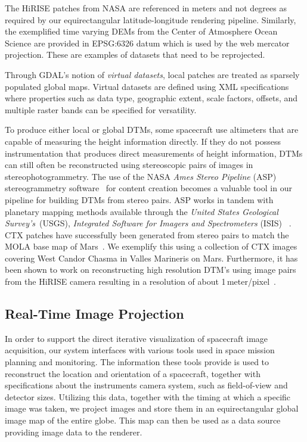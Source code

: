 \documentclass[journal]{vgtc}                %
\begin{document}
The HiRISE patches from NASA are referenced in meters and not degrees as required by our equirectangular latitude-longitude rendering pipeline.
Similarly, the exemplified time varying DEMs from the Center of Atmosphere Ocean Science are provided in EPSG:6326 datum which is used by the web mercator projection.
These are examples of datasets that need to be reprojected.

Through GDAL's notion of \emph{virtual datasets}, local patches are treated as sparsely populated global maps. Virtual datasets are defined using XML specifications where properties such as data type, geographic extent, scale factors, offsets, and multiple raster bands can be specified for versatility.

To produce either local or global DTMs, some spacecraft use altimeters that are capable of measuring the height information directly.
If they do not possess instrumentation that produces direct measurements of height information, DTMs can still often be reconstructed using stereoscopic pairs of images in stereophotogrammetry.
The use of the NASA \emph{Ames Stereo Pipeline} (ASP) stereogrammetry software~\cite{moratto2010ames} for content creation becomes a valuable tool in our pipeline for building DTMs from stereo pairs.
ASP works in tandem with planetary mapping methods available through the \emph{United States Geological Survey's}~(USGS), \emph{Integrated Software for Imagers and Spectrometers} (ISIS) ~\cite{gaddis1997overview}.
CTX patches have successfully been generated from stereo pairs to match the MOLA base map of Mars~\cite{broxton2008ames, mayer2016integrated}. We exemplify this using a collection of CTX images covering West Candor Chasma in Valles Marineris on Mars.
Furthermore, it has been shown to work on reconstructing high resolution DTM's using image pairs from the HiRISE camera resulting in a resolution of about 1\,meter/pixel~\cite{li2011rigorous}.

\subsection{Real-Time Image Projection} \label{sec:imageprojection}
In order to support the direct iterative visualization of spacecraft image acquisition, our system interfaces with various tools used in space mission planning and monitoring.
The information these tools provide is used to reconstruct the location and orientation of a spacecraft, together with specifications about the instruments camera system, such as field-of-view and detector sizes.
Utilizing this data, together with the timing at which a specific image was taken, we project images and store them in an equirectangular global image map of the entire globe. This map can then be used as a data source providing image data to the renderer.
\end{document}
